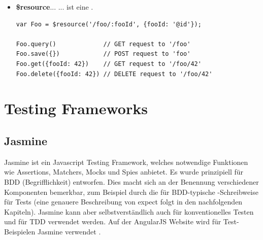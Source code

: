\begin{itemize}
  \newpage
  \item \textbf{\$resource}...\linebreak
      ... ist eine  \autocite{Angular:ServiceResource}.

      \begin{lstlisting}
var Foo = $resource('/foo/:fooId', {fooId: '@id'});

Foo.query()             // GET request to '/foo'
Foo.save({})            // POST request to 'foo'
Foo.get({fooId: 42})    // GET request to '/foo/42'
Foo.delete({fooId: 42}) // DELETE request to '/foo/42'
      \end{lstlisting}

\end{itemize}

\newpage
\section{Testing Frameworks}

\subsection{Jasmine}
Jasmine ist ein Javascript Testing Framework, welches notwendige Funktionen wie Assertions, Matchers, Mocks und Spies anbietet. Es wurde prinzipiell für BDD (Begrifflichkeit) entworfen. Dies macht sich an der Benennung verschiedener Komponenten bemerkbar, zum Beispiel durch die für BDD-typische -Schreibweise für Tests (eine genauere Beschreibung von expect folgt in den nachfolgenden Kapiteln). Jasmine kann aber selbstverständlich auch für konventionelles Testen und für TDD verwendet werden. Auf der AngularJS Website wird für Test-Beispielen Jasmine verwendet \autocite{Angular:Testing}.

